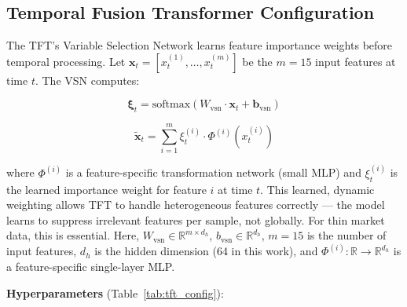 \documentclass[conference]{IEEEtran}
\begin{document}
\subsection{Temporal Fusion Transformer Configuration}

The TFT's Variable Selection Network learns feature importance weights before temporal processing. Let $\mathbf{x}_t = [x_t^{(1)}, \ldots, x_t^{(m)}]$ be the $m=15$ input features at time $t$. The VSN computes:

\begin{equation}
\boldsymbol{\xi}_t = \text{softmax}(W_{\text{vsn}} \cdot \mathbf{x}_t + \mathbf{b}_{\text{vsn}})
\label{eq:vsn}
\end{equation}

\begin{equation}
\tilde{\mathbf{x}}_t = \sum_{i=1}^{m} \xi_t^{(i)} \cdot \Phi^{(i)}(x_t^{(i)})
\label{eq:vsn_output}
\end{equation}

where $\Phi^{(i)}$ is a feature-specific transformation network (small MLP) and $\xi_t^{(i)}$ is the learned importance weight for feature $i$ at time $t$. This learned, dynamic weighting allows TFT to handle heterogeneous features correctly — the model learns to suppress irrelevant features per sample, not globally. For thin market data, this is essential. Here, $W_{\text{vsn}} \in \mathbb{R}^{m \times d_h}$, $b_{\text{vsn}} \in \mathbb{R}^{d_h}$, $m=15$ is the number of input features, $d_h$ is the hidden dimension (64 in this work), and $\Phi^{(i)}: \mathbb{R} \rightarrow \mathbb{R}^{d_h}$ is a feature-specific single-layer MLP.

\textbf{Hyperparameters} (Table~\ref{tab:tft_config}):
\end{document}
